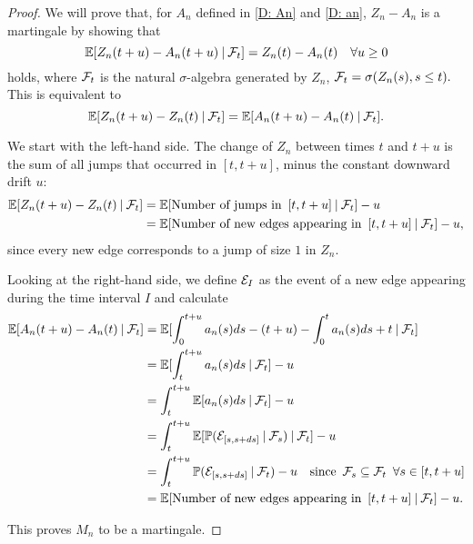 \begin{proof} \label{P: decomp Zn}
	We will prove that, for $A_n$ defined in \eqref{D: An} and \eqref{D: an},
	$Z_n - A_n$
	is a martingale by showing that
	\begin{equation} \label{E: Mn martingale}
	\mathbb{E}[ Z_n(t+u) - A_n(t+u) \: | \: \mathcal{F}_{t} ] = Z_n(t) - A_n(t) \quad \forall u \geq 0
	\end{equation}
	holds, where $\mathcal{F}_{t}$ is the natural $\sigma$-algebra generated by $Z_n$, 
	$\mathcal{F}_{t} = \sigma(Z_n(s), s \leq t).$
	This is equivalent to 
	\begin{equation}
	\mathbb{E}[Z_n(t+u) - Z_n(t) \: | \: \mathcal{F}_{t}] = \mathbb{E}[A_n(t+u) - A_n(t) \: | \: \mathcal{F}_{t}].
	\end{equation}
	
	We start with the left-hand side. 
	The change of $Z_n$ between times $t$ and $t+u$ is the sum of all jumps that occurred in $[t, t+u]$,
	minus the constant downward drift $u$:
	\begin{align*}
	\mathbb{E}[Z_n(t+u) - Z_n(t) \: | \: \mathcal{F}_{t}] 
	&= \mathbb{E}[\text{Number of jumps in} \enspace [t, t+u] \: | \: \mathcal{F}_{t}] - u \\
	&= \mathbb{E}[\text{Number of new edges appearing in} \enspace [t, t+u] \: | \: \mathcal{F}_{t}] - u,
	\end{align*}
	since every new edge corresponds to a jump of size $1$ in $Z_n$.
	
	Looking at the right-hand side, we define $\mathcal{E}_{I}$ as the event of a new edge appearing during the time interval $I$ and calculate
	\begin{align*}
	\mathbb{E}[A_n(t+u) - A_n(t) \: | \: \mathcal{F}_{t}]
	&= \mathbb{E}[ \int_{0}^{t+u} a_n(s)ds - (t+u) - \int_{0}^{t} a_n(s)ds + t \: | \: \mathcal{F}_{t} ] \\
	&= \mathbb{E}[ \int_{t}^{t+u} a_n(s)ds \: | \: \mathcal{F}_{t} ] - u \\
	&= \int_{t}^{t+u} \mathbb{E}[a_n(s)ds \: | \: \mathcal{F}_{t}] - u \\
	&= \int_{t}^{t+u} \mathbb{E}[ \mathbb{P}(\mathcal{E}_{[s, s+ds]} \: | \: \mathcal{F}_{s}) \: | \: \mathcal{F}_{t} ] - u\\
	&= \int_{t}^{t+u} \mathbb{P}( \mathcal{E}_{[s, s+ds]} \: | \: \mathcal{F}_{t} ) - u
	\quad \text{since} \enspace \mathcal{F}_{s} \subseteq \mathcal{F}_{t} \enspace \forall s \in [t,t+u] \\
	&= \mathbb{E}[\text{Number of new edges appearing in} \enspace [t, t+u] \: | \: \mathcal{F}_{t}] - u.
	\end{align*}
	
	This proves $M_n$ to be a martingale. 	
\end{proof}


